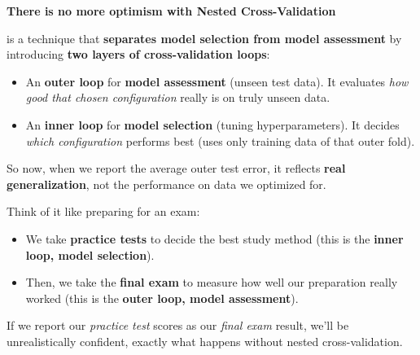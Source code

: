 \highspace
\begin{flushleft}
    \textcolor{Green3}{ \textbf{There is no more optimism with Nested Cross-Validation}}
\end{flushleft}
 is a technique that \textbf{separates model selection from model assessment} by introducing \textbf{two layers of cross-validation loops}:
\begin{itemize}
    \item An \textbf{outer loop} for \textbf{model assessment} (unseen test data). It evaluates \emph{how good that chosen configuration} really is on truly unseen data.
    \item An \textbf{inner loop} for \textbf{model selection} (tuning hyperparameters). It decides \emph{which configuration} performs best (uses only training data of that outer fold).
\end{itemize}
So now, when we report the average outer test error, it reflects \textbf{real generalization}, not the performance on data we optimized for.

\begin{examplebox}
    Think of it like preparing for an exam:
    \begin{itemize}
        \item We take \textbf{practice tests} to decide the best study method (this is the \textbf{inner loop, model selection}).
        \item Then, we take the \textbf{final exam} to measure how well our preparation really worked (this is the \textbf{outer loop, model assessment}).
    \end{itemize}
    If we report our \emph{practice test} scores as our \emph{final exam} result, we'll be unrealistically confident, exactly what happens without nested cross-validation.
\end{examplebox}

